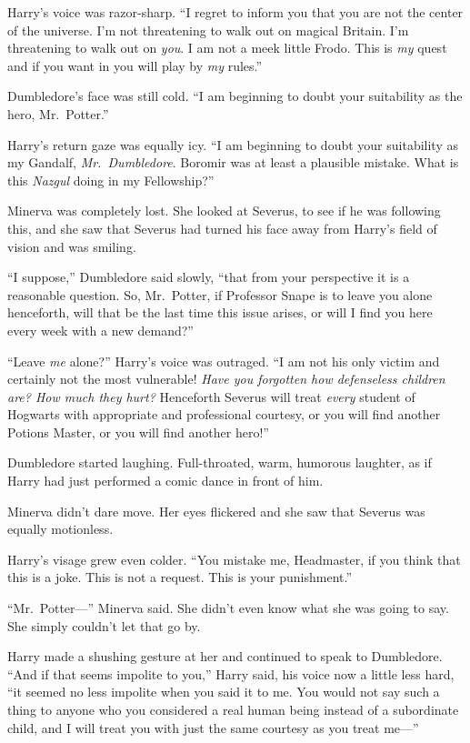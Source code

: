 Harry's voice was razor-sharp. ``I regret to inform you that you are not
the center of the universe. I'm not threatening to walk out on magical
Britain. I'm threatening to walk out on \emph{you}. I am not a meek
little Frodo. This is \emph{my} quest and if you want in you will play
by \emph{my} rules.''

Dumbledore's face was still cold. ``I am beginning to doubt your
suitability as the hero, Mr.~Potter.''

Harry's return gaze was equally icy. ``I am beginning to doubt your
suitability as my Gandalf, \emph{Mr.~Dumbledore}. Boromir was at least a
plausible mistake. What is this \emph{Nazgul} doing in my Fellowship?''

Minerva was completely lost. She looked at Severus, to see if he was
following this, and she saw that Severus had turned his face away from
Harry's field of vision and was smiling.

``I suppose,'' Dumbledore said slowly, ``that from your perspective it
is a reasonable question. So, Mr.~Potter, if Professor Snape is to leave
you alone henceforth, will that be the last time this issue arises, or
will I find you here every week with a new demand?''

``Leave \emph{me} alone?'' Harry's voice was outraged. ``I am not his
only victim and certainly not the most vulnerable! \emph{Have you
forgotten how defenseless children are? How much they hurt?} Henceforth
Severus will treat \emph{every} student of Hogwarts with appropriate and
professional courtesy, or you will find another Potions Master, or you
will find another hero!''

Dumbledore started laughing. Full-throated, warm, humorous laughter, as
if Harry had just performed a comic dance in front of him.

Minerva didn't dare move. Her eyes flickered and she saw that Severus
was equally motionless.

Harry's visage grew even colder. ``You mistake me, Headmaster, if you
think that this is a joke. This is not a request. This is your
punishment.''

``Mr.~Potter---'' Minerva said. She didn't even know what she was going
to say. She simply couldn't let that go by.

Harry made a shushing gesture at her and continued to speak to
Dumbledore. ``And if that seems impolite to you,'' Harry said, his voice
now a little less hard, ``it seemed no less impolite when you said it to
me. You would not say such a thing to anyone who you considered a real
human being instead of a subordinate child, and I will treat you with
just the same courtesy as you treat me---''

